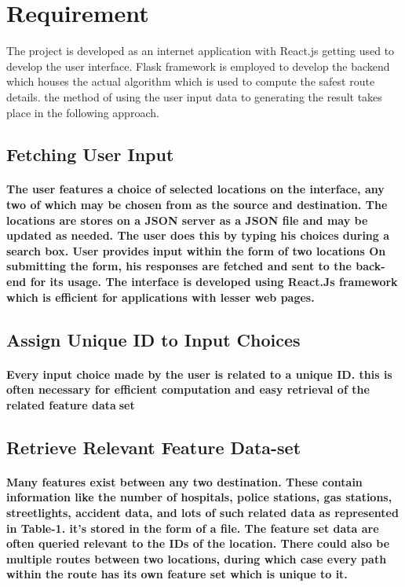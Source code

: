 \documentclass[12 pt,letterpaper]{article}
\begin{document}
\section{Requirement}
The project is developed as an internet application with React.js getting used to develop the user interface. Flask framework is employed to develop the backend which houses the actual algorithm which is used to compute the safest route details. the method of using the user input data to generating the result takes place in the following approach.

\subsection{Fetching User Input}
\paragraph{The user features a choice of selected locations on the interface, any two
of which may be chosen from as the source and destination. The locations are
stores on a JSON server as a JSON file and may be updated as needed. The user
does this by typing his choices during a search box. User provides input within
the form of two locations On submitting the form, his responses are fetched and
sent to the back-end for its usage. The interface is developed using React.Js
framework which is efficient for applications with lesser web pages.
}

\subsection{Assign Unique ID to Input Choices}
\paragraph{Every input choice made by the user is related to a unique ID. this is often necessary for efficient computation and easy retrieval of the related feature dataset}

\subsection{Retrieve Relevant Feature Data-set}
\paragraph{Many features exist between any two destination. These contain information like the number of hospitals, police stations, gas stations, streetlights, accident data, and lots of such related data as represented in Table-1. it’s stored in the form of a file. The feature set data are often queried relevant to the IDs of the location. There could also be multiple routes between two locations, during which case every path within the route has its own feature set which is unique to it.
}
\end{document}
